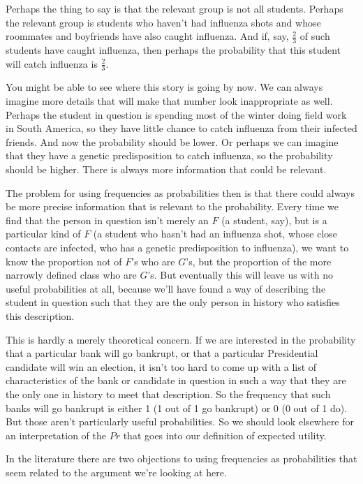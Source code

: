 Perhaps the thing to say is that the relevant group is not all students. Perhaps the relevant group is students who haven't had influenza shots and whose roommates and boyfriends have also caught influenza. And if, say, $\frac{2}{3}$ of such students have caught influenza, then perhaps the probability that this student will catch influenza is $\frac{2}{3}$.

You might be able to see where this story is going by now. We can always imagine more details that will make that number look inappropriate as well. Perhaps the student in question is spending most of the winter doing field work in South America, so they have little chance to catch influenza from their infected friends. And now the probability should be lower. Or perhaps we can imagine that they have a genetic predisposition to catch influenza, so the probability should be higher. There is always more information that could be relevant.

The problem for using frequencies as probabilities then is that there could always be more precise information that is relevant to the probability. Every time we find that the person in question isn't merely an $F$ (a student, say), but is a particular kind of $F$ (a student who hasn't had an influenza shot, whose close contacts are infected, who has a genetic predisposition to influenza), we want to know the proportion not of $F$'s who are $G$'s, but the proportion of the more narrowly defined class who are $G$'s. But eventually this will leave us with no useful probabilities at all, because we'll have found a way of describing the student in question such that they are the only person in history who satisfies this description.

This is hardly a merely theoretical concern. If we are interested in the probability that a particular bank will go bankrupt, or that a particular Presidential candidate will win an election, it isn't too hard to come up with a list of characteristics of the bank or candidate in question in such a way that they are the only one in history to meet that description. So the frequency that such banks will go bankrupt is either 1 (1 out of 1 go bankrupt) or 0 (0 out of 1 do). But those aren't particularly useful probabilities. So we should look elsewhere for an interpretation of the $Pr$ that goes into our definition of expected utility.

In the literature there are two objections to using frequencies as probabilities that seem related to the argument we're looking at here. 


